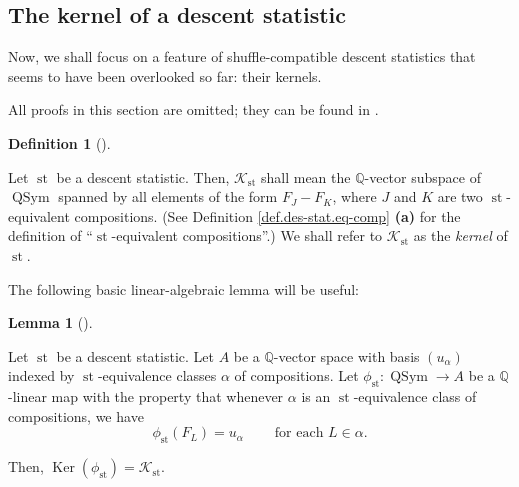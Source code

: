 \documentclass[numbers=enddot,12pt,final,onecolumn,notitlepage]{scrartcl}%
\theoremstyle{definition}
\newtheorem{lem}[theo]{Lemma}
\newenvironment{lemma}[1][]
{\begin{lem}[#1]\begin{leftbar}}
{\end{leftbar}\end{lem}}
\newtheorem{defi}[theo]{Definition}
\newenvironment{definition}[1][]
{\begin{defi}[#1]\begin{leftbar}}
{\end{leftbar}\end{defi}}
\newenvironment{vershort}{}{}
\begin{document}
\subsection{The kernel of a descent statistic}

Now, we shall focus on a feature of shuffle-compatible descent statistics that
seems to have been overlooked so far: their kernels.

\begin{vershort}
All proofs in this section are omitted; they can be found in \cite{verlong}.
\end{vershort}

\begin{definition}
Let $\operatorname{st}$ be a descent statistic. Then, $\mathcal{K}%
_{\operatorname{st}}$ shall mean the $\mathbb{Q}$-vector subspace of
$\operatorname*{QSym}$ spanned by all elements of the form $F_{J}-F_{K}$,
where $J$ and $K$ are two $\operatorname{st}$-equivalent compositions. (See
Definition \ref{def.des-stat.eq-comp} \textbf{(a)} for the definition of
\textquotedblleft$\operatorname{st}$-equivalent
compositions\textquotedblright.) We shall refer to $\mathcal{K}%
_{\operatorname{st}}$ as the \textit{kernel} of $\operatorname{st}$.
\end{definition}

The following basic linear-algebraic lemma will be useful:

\begin{lemma}
\label{lem.K.fist}Let $\operatorname{st}$ be a descent statistic. Let $A$ be
a $\mathbb{Q}$-vector space with basis $\left(  u_{\alpha}\right)  $ indexed
by $\operatorname{st}$-equivalence classes $\alpha$ of compositions. Let
$\phi_{\operatorname{st}}:\operatorname*{QSym}\rightarrow A$ be a
$\mathbb{Q}$-linear map with the property that whenever $\alpha$ is an
$\operatorname{st}$-equivalence class of compositions, we have%
\begin{equation}
\phi_{\operatorname{st}}\left(  F_{L}\right)  =u_{\alpha}%
\ \ \ \ \ \ \ \ \ \ \text{for each }L\in\alpha. \label{pf.prop.K.ideal.dir1.1}%
\end{equation}


Then, $\operatorname*{Ker}\left(  \phi_{\operatorname{st}}\right)
=\mathcal{K}_{\operatorname{st}}$.
\end{lemma}
\end{document}

